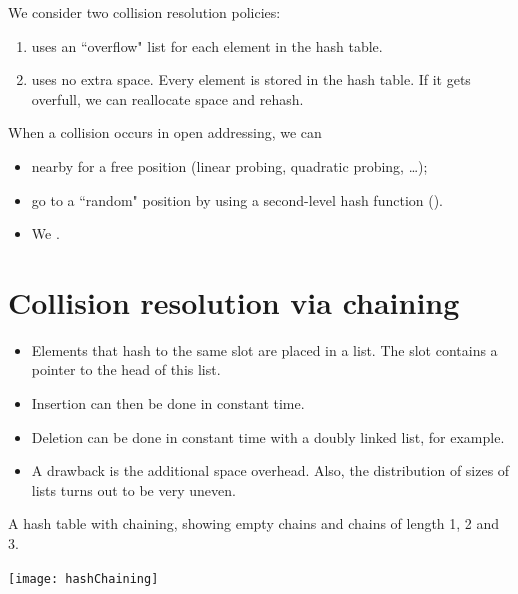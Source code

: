 We consider two collision resolution policies:
\begin{enumerate}
\item {} uses an ``overflow" list for each element in the hash table.
\item {} uses no extra space. Every element is stored in the hash table. 
If it gets overfull, we can reallocate space and rehash.
\end{enumerate}
When a collision occurs in open addressing, we can 
	\begin{itemize}
		\item {} nearby for a free position (linear probing, quadratic probing, \ldots);
		\item go to a ``random" position by using a second-level hash function 
		().
		\item We .
	\end{itemize}


\section{Collision resolution via chaining}
\begin{itemize}
\item Elements that hash to the same slot are placed in a list. 
The slot contains a pointer to the head of this list. 
\item Insertion can then be done in constant time. 
\item Deletion can be done in constant time with a doubly linked list, for example. 
\item A drawback is the additional space overhead. Also, the distribution of 
sizes of lists turns out to be very uneven.
\end{itemize}

\begin{Boxample}
A hash table with chaining, showing empty chains and chains of length 1, 2 and 3.
\begin{center}
\texttt{[image: hashChaining]} 
\end{center}
\label{ex:chaining}
\end{Boxample}

